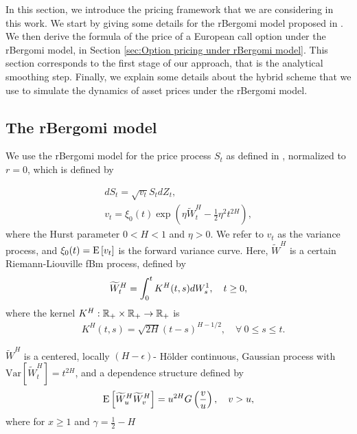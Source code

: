 In this section, we introduce the pricing framework that we are considering in this work. We start  by giving some details for the rBergomi model proposed in \cite{bayer2016pricing}. We then derive the formula of the price of a European call option under the rBergomi model, in Section \ref{sec:Option pricing under rBergomi model}. This section corresponds  to the first stage of our approach, that is the analytical smoothing step. Finally, we explain  some details about the hybrid scheme that we use to simulate the dynamics of asset prices under the rBergomi model.

\subsection{The rBergomi model}\label{sec:The rBergomi model}

We use  the rBergomi model for the price process $S_t$ as defined in  \cite{bayer2016pricing}, normalized to $r=0$, which is defined by

\begin{align}\label{eq:rBergomi_model1}
	dS_t = \sqrt{v_t} S_t dZ_t, \nonumber \\
	v_t = \xi_0(t) \exp\left( \eta \widetilde{W}_t^H - \frac{1}{2} \eta^2 t^{2H} \right),
\end{align}
where the Hurst parameter $0 < H < 1$  and  $\eta>0$. We refer to $v_t$ as the variance process, and $\xi_0(t) = \mathrm{E}\left[v_t\right]$ is  the forward variance curve.  Here, $\widetilde{W}^H $ is a certain Riemann-Liouville fBm
process,  defined by
\begin{align}\label{eq:Volterra process}
	\widetilde{W}_t^H = \int_0^t K^H(t,s) dW_s^1, \quad t \ge 0 ,
\end{align}
where the kernel $K^H : \mathbb{R}_+ \times \mathbb{R}_+ \rightarrow \mathbb{R}_+$ is
\begin{align*}
 \quad K^H(t,s) = \sqrt{2H} (t-s)^{H - 1/2},\quad \forall \: 0 \le s \le t.
\end{align*}

 $\widetilde{W}^H $ is a centered, locally $(H-\epsilon)$- H\"older continuous, Gaussian process with $\text{Var}\left[\widetilde{W}^H_t \right] = t^{2H}$, and a dependence structure defined by 
 \begin{equation*}
 \mathrm{E}\left[\widetilde{W}^H_u  \widetilde{W}^H_v\right]=u^{2H} G\left(\frac{v}{u} \right),\quad v >u ,
 \end{equation*}
 where for $x \ge 1$ and $\gamma=\frac{1}{2}-H$
 
